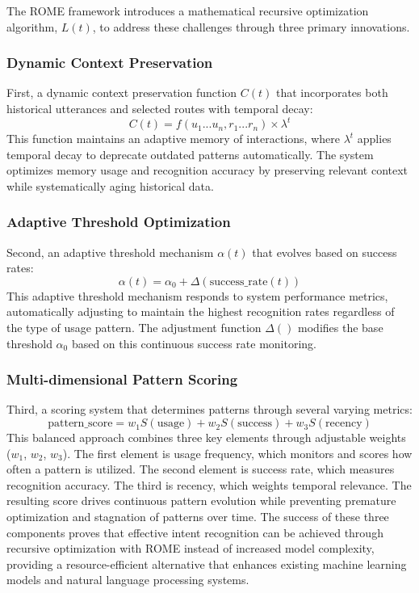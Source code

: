 \documentclass[12pt]{article}
\begin{document}
The ROME framework introduces a mathematical recursive optimization algorithm, $L(t)$, to address these challenges through three primary innovations.

\subsubsection{Dynamic Context Preservation}
First, a dynamic context preservation function $C(t)$ that incorporates both historical utterances and selected routes with temporal decay:
$$C(t) = f(u_1...u_n, r_1...r_n) \times \lambda^t$$
This function maintains an adaptive memory of interactions, where $\lambda^t$ applies temporal decay to deprecate outdated patterns automatically. The system optimizes memory usage and recognition accuracy by preserving relevant context while systematically aging historical data.

\subsubsection{Adaptive Threshold Optimization}
Second, an adaptive threshold mechanism $\alpha(t)$ that evolves based on success rates:
$$\alpha(t) = \alpha_0 + \Delta(\text{success\_rate}(t))$$
This adaptive threshold mechanism responds to system performance metrics, automatically adjusting to maintain the highest recognition rates regardless of the type of usage pattern. The adjustment function $\Delta()$ modifies the base threshold $\alpha_0$ based on this continuous success rate monitoring.

\subsubsection{Multi-dimensional Pattern Scoring}
Third, a scoring system that determines patterns through several varying metrics:
$$\text{pattern\_score} = w_1S(\text{usage}) + w_2S(\text{success}) + w_3S(\text{recency})$$
This balanced approach combines three key elements through adjustable weights ($w_1$, $w_2$, $w_3$). The first element is usage frequency, which monitors and scores how often a pattern is utilized. The second element is success rate, which measures recognition accuracy. The third is recency, which weights temporal relevance. The resulting score drives continuous pattern evolution while preventing premature optimization and stagnation of patterns over time. The success of these three components proves that effective intent recognition can be achieved through recursive optimization with ROME instead of increased model complexity, providing a resource-efficient alternative that enhances existing machine learning models and natural language processing systems.
\end{document}
